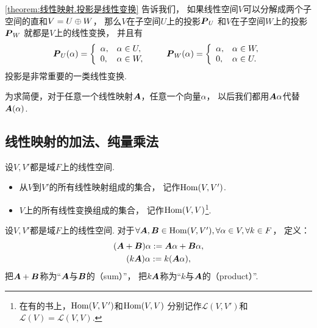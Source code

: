 \cref{theorem:线性映射.投影是线性变换} 告诉我们，
如果线性空间\(V\)可以分解成两个子空间的直和\(V = U \oplus W\)，
那么\(V\)在子空间\(U\)上的投影\(\boldsymbol{P}_U\)
和\(V\)在子空间\(W\)上的投影\(\boldsymbol{P}_W\)
就都是\(V\)上的线性变换，
并且有\begin{equation*}
	\boldsymbol{P}_U(\alpha)
	=\left\{ \begin{array}{ll}
		\alpha, & \alpha\in U, \\
		0, & \alpha\in W,
	\end{array} \right.
	\qquad
	\boldsymbol{P}_W(\alpha)
	=\left\{ \begin{array}{ll}
		\alpha, & \alpha\in W, \\
		0, & \alpha\in U.
	\end{array} \right.
\end{equation*}
投影是非常重要的一类线性变换.

为求简便，对于任意一个线性映射\(\boldsymbol{A}\)，任意一个向量\(\alpha\)，
以后我们都用\(\boldsymbol{A}\alpha\)代替\(\boldsymbol{A}(\alpha)\).

\subsection{线性映射的加法、纯量乘法}
\begin{definition}
设\(V,V'\)都是域\(F\)上的线性空间.

\begin{itemize}
	\item 从\(V\)到\(V'\)的所有线性映射组成的集合，
	记作\(\operatorname{Hom}(V,V')\).

	\item \(V\)上的所有线性变换组成的集合，
	记作\(\operatorname{Hom}(V,V)\)\footnote{
		在有的书上，\(\operatorname{Hom}(V,V')\)和\(\operatorname{Hom}(V,V)\)
		分别记作\(\mathcal{L}(V,V')\)和\(\mathcal{L}(V) = \mathcal{L}(V,V)\).
	}.
\end{itemize}
\end{definition}

\begin{definition}
设\(V,V'\)都是域\(F\)上的线性空间.
对于\(\forall\boldsymbol{A},\boldsymbol{B}\in\operatorname{Hom}(V,V'),
\forall\alpha\in V,
\forall k\in F\)，
定义：\begin{gather*}
	(\boldsymbol{A}+\boldsymbol{B})\alpha
	:=
	\boldsymbol{A}\alpha+\boldsymbol{B}\alpha, \\
	(k\boldsymbol{A})\alpha
	:=
	k(\boldsymbol{A}\alpha),
\end{gather*}
把\(\boldsymbol{A}+\boldsymbol{B}\)称为“\(\boldsymbol{A}\)与\(\boldsymbol{B}\)的（sum）”，
把\(k\boldsymbol{A}\)称为“\(k\)与\(\boldsymbol{A}\)的（product）”.
\end{definition}

